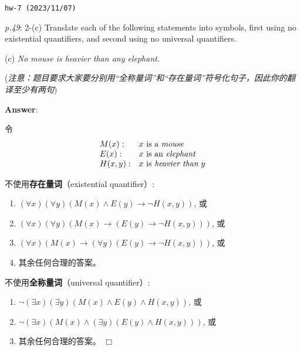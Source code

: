 \documentclass[UTF8,12pt,a4paper]{ctexart}
\begin{document}
\noindent\texttt{hw-7 (2023/11/07)}

\emph{p.49}: 2-(c) \quad
Translate each of the following statements into symbols, {\color{purple} first} using no existential quantifiers, and {\color{purple} second} using no universal quantifiers. 

\qquad (c) \hspace{3cm}  \textit{No mouse is heavier than any elephant.}

(\textit{注意：题目要求大家要分别用“全称量词”和“存在量词”符号化句子，因此你的翻译至少有两句})

\noindent\textbf{Answer}:   

令 
\[\begin{array}{l l l}
	M(x):& x \text{ is a \textit{mouse}}\\
	E(x): & x \text{ is an \textit{elephant}}\\
	H(x,y): & x \text{ is \textit{heavier than}\;} y \\
\end{array}\]

不使用\textbf{存在量词}（existential quantifier）: 
\begin{enumerate}
	\item $(\forall x) (\forall y) (M(x) \land E(y) \to \neg H(x,y))$, 或
	
	\item $(\forall x) (\forall y) (M(x) \to (E(y) \to \neg H(x,y)))$, 或
	
	\item $(\forall x)  (M(x) \to (\forall y) (E(y) \to \neg H(x,y)))$, 或
	
	\item 其余任何合理的答案。
\end{enumerate}

\vspace{1em}

不使用\textbf{全称量词}（universal quantifier）:
\begin{enumerate}
	\item $\neg (\exists x) (\exists y) (M(x) \land E(y) \land H(x,y))$, 或
	
	\item $\neg (\exists x)  (M(x) \land (\exists y) (E(y) \land H(x,y)))$, 或
	
	\item 其余任何合理的答案。
	\hfill $\Box$
\end{enumerate}
\end{document}
